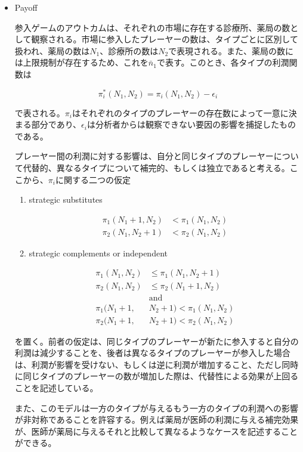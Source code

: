 \documentclass[11pt]{jsarticle}
\begin{document}
\begin{itemize}
  \item Payoff

  参入ゲームのアウトカムは、それぞれの市場に存在する診療所、薬局の数として観察される。市場に参入したプレーヤーの数は、タイプごとに区別して扱われ、薬局の数は$N_1$、診療所の数は$N_2$で表現される。また、薬局の数には上限規制が存在するため、これを$\bar{n}_1$で表す。このとき、各タイプの利潤関数は

  \[
  \pi^*_i(N_1, N_2) = \pi_i(N_1, N_2) - \epsilon_i
  \]

  で表される。$\pi_i$はそれぞれのタイプのプレーヤーの存在数によって一意に決まる部分であり、$\epsilon_i$は分析者からは観察できない要因の影響を捕捉したものである。

  プレーヤー間の利潤に対する影響は、自分と同じタイプのプレーヤーについて代替的、異なるタイプについて補完的、もしくは独立であると考える。ここから、$\pi_i$に関する二つの仮定

  \begin{enumerate}
    \item strategic substitutes

    \begin{align*}
      \pi_1(N_1 + 1, N_2) &< \pi_1(N_1, N_2) \\
      \pi_2(N_1, N_2 + 1) &< \pi_2(N_1, N_2)
    \end{align*}

    \item strategic complements or independent

    \begin{align*}
      \pi_1(N_1, N_2) &\leq \pi_1(N_1, N_2 + 1) \\
      \pi_2(N_1, N_2) &\leq \pi_2(N_1 + 1, N_2) \\
      & \text{and} \\
      \pi_1(N_1 + 1, & N_2 + 1) < \pi_1(N_1, N_2) \\
      \pi_2(N_1 + 1, & N_2 + 1) < \pi_2(N_1, N_2)
    \end{align*}

  \end{enumerate}

  を置く。前者の仮定は、同じタイプのプレーヤーが新たに参入すると自分の利潤は減少することを、後者は異なるタイプのプレーヤーが参入した場合は、利潤が影響を受けない、もしくは逆に利潤が増加すること、ただし同時に同じタイプのプレーヤーの数が増加した際は、代替性による効果が上回ることを記述している。

  また、このモデルは一方のタイプが与えるもう一方のタイプの利潤への影響が非対称であることを許容する。例えば薬局が医師の利潤に与える補完効果が、医師が薬局に与えるそれと比較して異なるようなケースを記述することができる。


\end{itemize}
\end{document}
